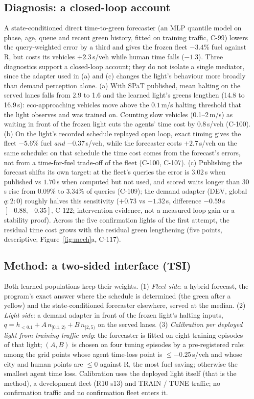 \documentclass[11pt]{article}
\begin{document}
\subsection{Diagnosis: a closed-loop account}
A state-conditioned direct time-to-green forecaster (an MLP quantile model on phase, age, queue and recent green history, fitted on training
traffic, C-99) lowers the query-weighted error by a third and gives the frozen fleet $-3.4\%$ fuel against R, but costs its vehicles
$+2.3$\,s/veh while human time falls ($-1.3$). Three diagnostics support a closed-loop account; they do not isolate a single mediator,
since the adapter used in (a) and (c) changes the light's behaviour more broadly than demand perception alone.
(a) With SPaT published, mean halting on the served lanes falls from 2.9 to 1.6 and the learned light's greens lengthen (14.8 to 16.9\,s):
eco-approaching vehicles move above the $0.1$\,m/s halting threshold that the light observes and was trained on. Counting slow vehicles
(0.1--2\,m/s) as waiting in front of the frozen light cuts the agents' time cost by $0.8$\,s/veh (C-100).
(b) On the light's recorded schedule replayed open loop, exact timing gives the fleet $-5.6\%$ fuel \emph{and} $-0.37$\,s/veh, while the forecaster
costs $+2.7$\,s/veh on the same schedule: on that schedule the time cost comes from the forecast's errors, not from a time-for-fuel
trade-off of the fleet (C-100, C-107).
(c) Publishing the forecast shifts its own target: at the fleet's queries the error is $3.02$\,s when published vs $1.70$\,s when computed
but not used, and scored waits longer than 30\,s rise from $0.09\%$ to $3.34\%$ of queries (C-109); the demand adapter (DEV, global $q{:}2{:}0$) roughly halves this
sensitivity ($+0.73$ vs $+1.32$\,s, difference $-0.59$\,s $[-0.88,-0.35]$, C-122; intervention evidence, not a measured loop gain or a stability proof). Across the five confirmation lights of the first attempt, the residual time cost grows with the residual green
lengthening (five points, descriptive; Figure~\ref{fig:mech}a, C-117).

\subsection{Method: a two-sided interface (TSI)}
Both learned populations keep their weights. (1) \emph{Fleet side}: a hybrid forecast, the program's exact answer where the schedule is
determined (the green after a yellow) and the state-conditioned forecaster elsewhere, served at the median. (2) \emph{Light side}: a demand
adapter in front of the frozen light's halting inputs, $q = h_{<0.1} + A\,n_{[0.1,2)} + B\,n_{[2,5)}$ on the served lanes. (3)
\emph{Calibration per deployed light from training traffic only}: the forecaster is fitted on eight training episodes of that light; $(A,B)$
is chosen on four tuning episodes by a pre-registered rule: among the grid points whose agent time-loss point is $\le -0.25$\,s/veh and
whose city and human points are $\le 0$ against R, the most fuel saving; otherwise the smallest agent time loss. Calibration uses the
deployed light itself (that is the method), a development fleet (R10 s13) and TRAIN / TUNE traffic; no confirmation traffic and no
confirmation fleet enters it.
\end{document}
